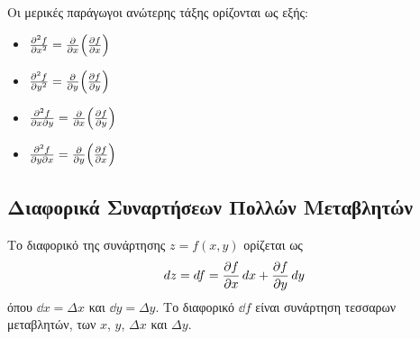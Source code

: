 Οι μερικές παράγωγοι ανώτερης τάξης ορίζονται ως εξής:

\begin{itemize}
  \item $\pdv[2]{f}{x}=\pdv{x}(\pdv{f}{x})$
  \item $\pdv[2]{f}{y}=\pdv{y}(\pdv{f}{y})$
  \item $\pdv[2]{f}{x}{y}=\pdv{x}(\pdv{f}{y})$
  \item $\pdv[2]{f}{y}{x}=\pdv{y}(\pdv{f}{x})$
\end{itemize}

\subsection{Διαφορικά Συναρτήσεων Πολλών Μεταβλητών}

Το διαφορικό της συνάρτησης $z=f(x,y)$ ορίζεται ως
\[
  \dd{z}=\dd{f}=\pdv{f}{x}\dd{x}+\pdv{f}{y}\dd{y}
\]
όπου $\dd{x}=\Delta x$ και $\dd{y}=\Delta y$. Το διαφορικό $\dd{f}$ είναι συνάρτηση τεσσαρων μεταβλητών, των $x$, $y$, $\Delta x$ και $\Delta y$.
